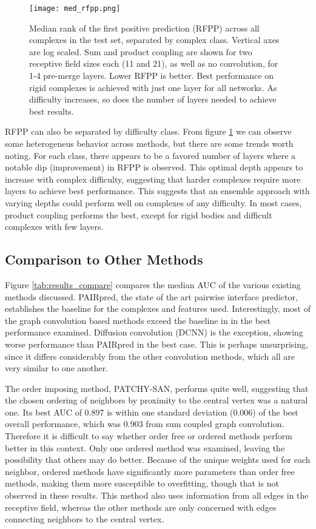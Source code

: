 \begin{figure}
	\texttt{[image: med\_rfpp.png]}
	\caption{Median rank of the first positive prediction (RFPP) across all complexes in the test set, separated by complex class. Vertical axes are log scaled. Sum and product coupling are shown for two receptive field sizes each (11 and 21), as well as no convolution, for 1-4 pre-merge layers. Lower RFPP is better. Best performance on rigid complexes is achieved with just one layer for all networks. As difficulty increases, so does the number of layers needed to achieve best results.
		\label{fig:med_rfpp}}
\end{figure}

RFPP can also be separated by difficulty class.
From figure \ref{fig:med_rfpp} we can observe some heterogeneus behavior across methods, but there are some trends worth noting.
For each class, there appears to be a favored number of layers where a notable dip (improvement) in RFPP is observed. 
This optimal depth appears to increase with complex difficulty, suggesting that harder complexes require more layers to achieve best performance.
This suggests that an ensemble approach with varying depths could perform well on complexes of any difficulty. 
In most cases, product coupling performs the best, except for rigid bodies and difficult complexes with few layers.



\subsection{Comparison to Other Methods}

Figure \ref{tab:results_compare} compares the median AUC of the various existing methods discussed.
PAIRpred, the state of the art pairwise interface predictor, establishes the baseline for the complexes and features used.
Interestingly, most of the graph convolution based methods exceed the baseline in in the best performance examined.
Diffusion convolution (DCNN) is the exception, showing worse performance than PAIRpred in the best case.
This is perhaps unsurprising, since it differs considerably from the other convolution methods, which all are very similar to one another.

The order imposing method, PATCHY-SAN, performs quite well, suggesting that the chosen ordering of neighbors by proximity to the central vertex was a natural one.
Its best AUC of 0.897 is within one standard deviation (0.006) of the best overall performance, which was 0.903 from sum coupled graph convolution.
Therefore it is difficult to say whether order free or ordered methods perform better in this context. 
Only one ordered method was examined, leaving the possibility that others may do better.
Because of the unique weights used for each neighbor, ordered methods have significantly more parameters than order free methods, making them more susceptible to overfitting, though that is not observed in these results.
This method also uses information from all edges in the receptive field, whereas the other methods are only concerned with edges connecting neighbors to the central vertex.

